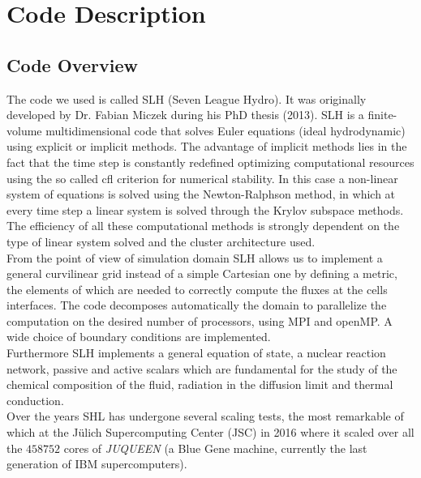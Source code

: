 \chapter{Code Description}
\section{Code Overview}
The code we used is called SLH (Seven League Hydro). It was originally developed by Dr. Fabian Miczek during his PhD thesis (2013). SLH is a finite-volume multidimensional code that solves Euler equations (ideal hydrodynamic) using explicit or implicit methods. The advantage of implicit methods lies in the fact that the time step is constantly redefined optimizing computational resources using the so called cfl criterion for numerical stability. In this case a non-linear system of equations is solved using the Newton-Ralphson method, in which at every time step a linear system is solved through the Krylov subspace methods. The efficiency of all these computational methods is strongly dependent on the type of linear system solved and the cluster architecture used. \\
From the point of view of simulation domain SLH allows us to implement a general curvilinear grid instead of a simple Cartesian one by defining a metric, the elements of which are needed to correctly compute the fluxes at the cells interfaces. The code decomposes automatically the domain to parallelize the computation on the desired number of processors, using MPI and openMP. A wide choice of boundary conditions are implemented. \\
Furthermore SLH implements a general equation of state, a nuclear reaction network, passive and active scalars which are fundamental for the study of the chemical composition of the fluid, radiation in the diffusion limit and thermal conduction. \\
Over the years SHL has undergone several scaling tests, the most remarkable of which at the Jülich Supercomputing Center (JSC) in 2016 where it scaled over all the $458752$ cores of \textit{JUQUEEN} (a Blue Gene machine, currently the last generation of IBM supercomputers).

